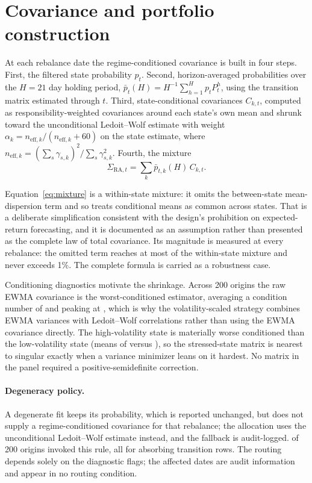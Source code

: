 \documentclass[11pt,letterpaper]{article}
\begin{document}
\section{Covariance and portfolio construction}
\label{sec:covariance}

At each rebalance date the regime-conditioned covariance is built in
four steps. First, the filtered state probability $p_t$. Second,
horizon-averaged probabilities over the $H = 21$ day holding period,
$\bar{p}_t(H) = H^{-1}\sum_{h=1}^{H} p_t P_t^h$, using the transition
matrix estimated through $t$. Third, state-conditional covariances
$C_{k,t}$, computed as responsibility-weighted covariances around each
state's own mean and shrunk toward the unconditional Ledoit--Wolf
estimate with weight $\alpha_k = n_{\text{eff},k} /
(n_{\text{eff},k} + 60)$ on the state estimate, where
$n_{\text{eff},k} = (\sum_s \gamma_{s,k})^2 / \sum_s \gamma_{s,k}^2$.
Fourth, the mixture
\begin{equation}
\Sigma_{\text{RA},t} = \sum_k \bar{p}_{t,k}(H)\, C_{k,t}.
\label{eq:mixture}
\end{equation}

Equation~\eqref{eq:mixture} is a within-state mixture: it omits the
between-state mean-dispersion term and so treats conditional means as
common across states. That is a deliberate simplification consistent
with the design's prohibition on expected-return forecasting, and it is
documented as an assumption rather than presented as the complete law of
total covariance. Its magnitude is measured at every rebalance: the
omitted term reaches at most \betweenStateMax{} of the within-state
mixture and never exceeds 1\%. The complete formula is carried as a
robustness case.

Conditioning diagnostics motivate the shrinkage. Across 200 origins the
raw EWMA covariance is the worst-conditioned estimator, averaging a
condition number of \ewmaMeanCondition{} and peaking at
\ewmaMaxCondition{}, which is why the
volatility-scaled strategy combines EWMA variances with Ledoit--Wolf
correlations rather than using the EWMA covariance directly. The
high-volatility state is materially worse conditioned than the
low-volatility state (means of \stateOneCondition{} versus
\stateZeroCondition{}), so the stressed-state
matrix is nearest to singular exactly when a variance minimizer leans on
it hardest. No matrix in the panel required a positive-semidefinite
correction.

\paragraph{Degeneracy policy.} A degenerate fit keeps its probability,
which is reported unchanged, but does not supply a regime-conditioned
covariance for that rebalance; the allocation uses the unconditional
Ledoit--Wolf estimate instead, and the fallback is audit-logged.
\aTwoFallbackOrigins{} of
200 origins invoked this rule, all for absorbing transition rows. The
routing depends solely on the diagnostic flags; the affected dates are
audit information and appear in no routing condition.
\end{document}
